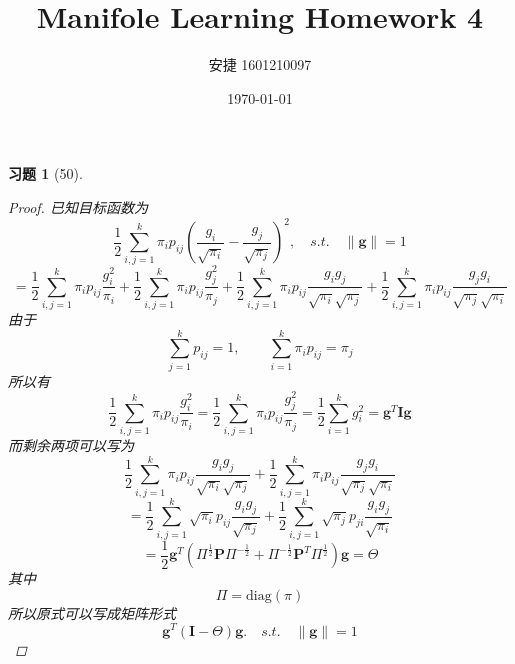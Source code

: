 \documentclass[a4paper, UTF8]{ctexart}
\title{Manifole Learning Homework 4}
\date{\today}
\author{安捷 1601210097}
\newtheorem*{exercise}{\textbf{习题}}
\begin{document}
\maketitle
  \begin{exercise}[50]
    \begin{proof}
      已知目标函数为
      \begin{equation}
        \frac{1}{2} \sum_{i,j=1}^k \pi_i p_{ij}\left( \frac{g_i}{\sqrt{\pi_i}} - \frac{g_j}{\sqrt{\pi_j}}\right)^2,\quad s.t.\quad \lVert \mathbf{g} \rVert = 1
      \end{equation}
      \begin{equation}
        = \frac{1}{2}\sum_{i,j=1}^k \pi_i p_{ij} \frac{g_i^2}{\pi_i} + \frac{1}{2}\sum_{i,j=1}^k\pi_i p_{ij} \frac{g_j^2}{\pi_j} + \frac{1}{2} \sum_{i,j=1}^k \pi_i p_{ij}\frac{g_i g_j}{\sqrt{\pi_i} \sqrt{\pi_j}} + \frac{1}{2} \sum_{i,j=1}^k \pi_i p_{ij}\frac{g_j g_i}{\sqrt{\pi_j} \sqrt{\pi_i}}
      \end{equation}
      由于
      \begin{equation}
        \sum_{j=1}^kp_{ij} = 1, \qquad \sum_{i = 1}^k \pi_i p_{ij} = \pi_j
      \end{equation}
      所以有
      \begin{equation}
        \frac{1}{2}\sum_{i,j=1}^k \pi_i p_{ij}\frac{g_i^2}{\pi_i} = \frac{1}{2}\sum_{i,j=1}^k \pi_i p_{ij}\frac{g_j^2}{\pi_j} = \frac{1}{2}\sum_{i=1}^k g_i^2 = \mathbf{g}^T \mathbf{I} \mathbf{g}
      \end{equation}
      而剩余两项可以写为
      \begin{equation}
        \frac{1}{2} \sum_{i,j=1}^k \pi_i p_{ij}\frac{g_i g_j}{\sqrt{\pi_i} \sqrt{\pi_j}} + \frac{1}{2} \sum_{i,j=1}^k \pi_i p_{ij}\frac{g_j g_i}{\sqrt{\pi_j} \sqrt{\pi_i}}
      \end{equation}
      \begin{equation}
        = \frac{1}{2} \sum_{i,j=1}^k \sqrt{\pi_i} p_{ij}\frac{g_i g_j}{\sqrt{\pi_j}}+ \frac{1}{2} \sum_{i,j=1}^k \sqrt{\pi_j} p_{ji}\frac{g_i g_j}{\sqrt{\pi_i}}
      \end{equation}
      \begin{equation}
        = \frac{1}{2}\mathbf{g}^T\left( \Pi^{\frac{1}{2}}\mathbf{P}\Pi^{-\frac{1}{2}} + \Pi^{-\frac{1}{2}} \mathbf{P}^T \Pi^{\frac{1}{2}} \right)\mathbf{g} = \Theta
      \end{equation}
      其中
      \begin{equation}
        \Pi = \mathrm{diag}\left( \pi \right)
      \end{equation}
      所以原式可以写成矩阵形式
      \begin{equation}
        \mathbf{g}^T \left( \mathbf{I} - \Theta \right) \mathbf{g}. \quad s.t. \quad \lVert \mathbf{g}\rVert = 1
      \end{equation}
    \end{proof}
  \end{exercise}
\end{document}
